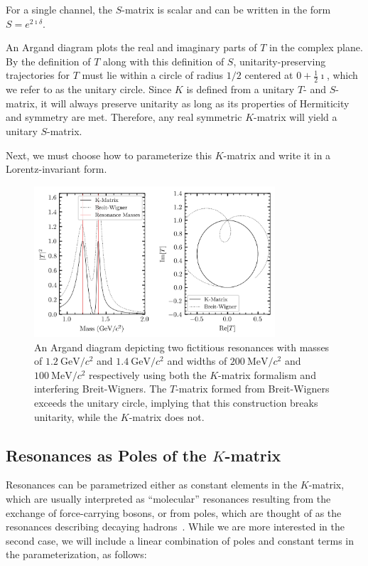 For a single channel, the $S$-matrix is scalar and can be written in the form $S=e^{2\imath \delta}$.

An Argand diagram plots the real and imaginary parts of $T$ in the complex plane. By the definition of $T$ along with this definition of $S$, unitarity-preserving trajectories for $T$ must lie within a circle of radius $1/2$ centered at $0+\frac{1}{2}\imath$, which we refer to as the unitary circle. Since $K$ is defined from a unitary $T$- and $S$-matrix, it will always preserve unitarity as long as its properties of Hermiticity and symmetry are met. Therefore, any real symmetric $K$-matrix will yield a unitary $S$-matrix.

Next, we must choose how to parameterize this $K$-matrix and write it in a Lorentz-invariant form.

\begin{figure}
  \begin{center}
    \includegraphics[width=0.8\textwidth]{figures/argand_diagram.png}
  \end{center}
  \caption{An Argand diagram depicting two fictitious resonances with masses of $\SI{1.2}{\giga\eV}/c^2$ and $\SI{1.4}{\giga\eV}/c^2$ and widths of $\SI{200}{\mega\eV}/c^2$ and $\SI{100}{\mega\eV}/c^2$ respectively using both the $K$-matrix formalism and interfering Breit-Wigners. The $T$-matrix formed from Breit-Wigners exceeds the unitary circle, implying that this construction breaks unitarity, while the $K$-matrix does not.}\label{fig:argand-diagram}
\end{figure}

\subsection{Resonances as Poles of the $K$-matrix}

Resonances can be parametrized either as constant elements in the $K$-matrix, which are usually interpreted as ``molecular'' resonances resulting from the exchange of force-carrying bosons, or from poles, which are thought of as the resonances describing decaying hadrons~\cite{au_meson_1987}. While we are more interested in the second case, we will include a linear combination of poles and constant terms in the parameterization, as follows:

